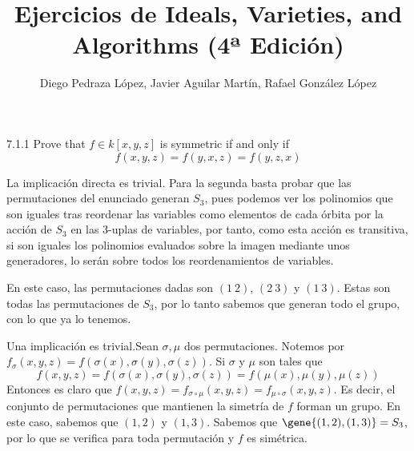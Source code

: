 \documentclass[twoside]{article}
\begin{document}
\title{Ejercicios de Ideals, Varieties, and Algorithms (4ª Edición)}
\author{Diego Pedraza López, Javier Aguilar Martín, Rafael González López}
\maketitle

\begin{ejercicio}{7.1.1}
Prove that $f ∈ k[x, y, z]$ is symmetric if and only if $$f (x, y, z)= f (y, x, z) = f (y, z, x)$$
\end{ejercicio}
\begin{solucion}
La implicación directa es trivial. Para la segunda basta probar que las permutaciones del enunciado generan $S_3$, pues podemos ver los polinomios que son iguales tras reordenar las variables como elementos de cada órbita por la acción de $S_3$ en las 3-uplas de variables, por tanto, como esta acción es transitiva, si son iguales los polinomios evaluados sobre la imagen mediante unos generadores, lo serán sobre todos los reordenamientos de variables.

En este caso, las permutaciones dadas son $(1\ 2)$,  $(2\ 3)$ y $(1\ 3)$. Estas son todas las permutaciones de $S_3$, por lo tanto sabemos que generan todo el grupo, con lo que ya lo tenemos. 
\end{solucion}

\begin{solucion}
Una implicación es trivial.Sean $\sigma,\mu$ dos permutaciones. Notemos por $f_\sigma(x,y,z) =  f(\sigma(x),\sigma(y),\sigma(z))$. Si $\sigma$ y $\mu$ son tales que
$$f(x,y,z)=f(\sigma(x),\sigma(y),\sigma(z))=f(\mu(x),\mu(y),\mu(z))$$
Entonces es claro que $f(x,y,z)=f_{\sigma \circ \mu}(x,y,z)=f_{ \mu\circ \sigma}(x,y,z)$. Es decir, el conjunto de permutaciones que mantienen la simetría de $f$ forman un grupo. En este caso, sabemos que $(1,2)$ y $(1,3)$. Sabemos que $\gene{(1,2),(1,3)}=S_3$, por lo que se verifica para toda permutación y $f$ es simétrica.
\end{solucion}

\newpage
\end{document}
